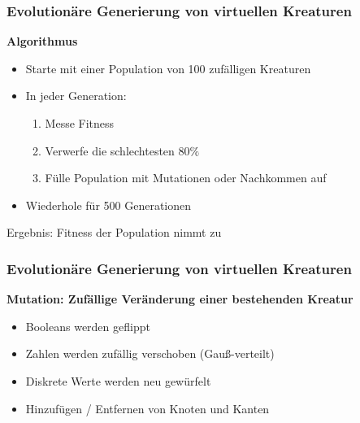 \documentclass{beamer}
\begin{document}
\begin{frame}
	\frametitle{Evolutionäre Generierung von virtuellen Kreaturen}
	\textbf{Algorithmus}\\
	\vspace{1em}
	\pause
	\begin{itemize}
		\item Starte mit einer Population von 100 zufälligen Kreaturen \pause \\
		\vspace{1em}
		\item In jeder Generation:
		\begin{enumerate}
			\item Messe Fitness
			\item Verwerfe die schlechtesten $80\%$
			\item Fülle Population mit Mutationen oder Nachkommen auf
		\end{enumerate}
		\pause
		\vspace{1em}
		\item Wiederhole für 500 Generationen\\
	\end{itemize}
	\vspace{2em}
	\pause
	Ergebnis: Fitness der Population nimmt zu \checkmark
\end{frame}

\begin{frame}
	\frametitle{Evolutionäre Generierung von virtuellen Kreaturen}
	
	\textbf{Mutation: Zufällige Veränderung einer bestehenden Kreatur}
	\pause
	\vspace{1em}
	\begin{itemize}
		\item Booleans werden geflippt
		\item Zahlen werden zufällig verschoben (Gauß-verteilt)
		\item Diskrete Werte werden neu gewürfelt
		\item Hinzufügen / Entfernen von Knoten und Kanten
	\end{itemize}
\end{frame}
\end{document}
